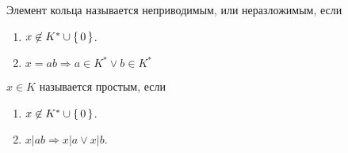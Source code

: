 \begin{define*}
  Элемент кольца называется неприводимым, или неразложимым, если 
  \begin{enumerate}
      \item $x \not\in K^* \cup \set{0}$.
      \item $x = ab \Longrightarrow a \in K^* \lor b \in K^*$
  \end{enumerate}
\end{define*}

\begin{define*}
  $x \in K$ называется простым, если
  \begin{enumerate}
    \item $x \not\in K^* \cup \set{0}$.
    \item $x | ab \Longrightarrow x | a \lor x | b$.
  \end{enumerate}
\end{define*}



